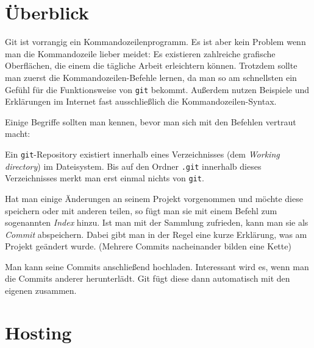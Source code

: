 %
%
%

\section{Überblick}


Git ist vorrangig ein Kommandozeilenprogramm.
Es ist aber kein Problem wenn man die Kommandozeile lieber meidet: Es existieren zahlreiche grafische Oberflächen, die einem die tägliche Arbeit erleichtern können.
Trotzdem sollte man zuerst die Kommandozeilen-Befehle lernen, da man so am schnellsten ein Gefühl für die Funktionsweise von \texttt{git} bekommt.
Außerdem nutzen Beispiele und Erklärungen im Internet fast ausschließlich die Kommandozeilen-Syntax.

Einige Begriffe sollten man kennen, bevor man sich mit den Befehlen vertraut macht:

Ein \texttt{git}-Repository existiert innerhalb eines Verzeichnisses (dem \textit{Working directory}) im Dateisystem.
Bis auf den Ordner \verb|.git| innerhalb dieses Verzeichnisses merkt man erst einmal nichts von \texttt{git}.

Hat man einige Änderungen an seinem Projekt vorgenommen und möchte diese speichern oder mit anderen teilen, so fügt man sie mit einem Befehl zum sogenannten \textit{Index} hinzu.
Ist man mit der Sammlung zufrieden, kann man sie als \textit{Commit} abspeichern.
Dabei gibt man in der Regel eine kurze Erklärung, was am Projekt geändert wurde.
(Mehrere Commits nacheinander bilden eine Kette)

Man kann seine Commits anschließend hochladen.
Interessant wird es, wenn man die Commits anderer herunterlädt.
Git fügt diese dann automatisch mit den eigenen zusammen.

\section{Hosting}

